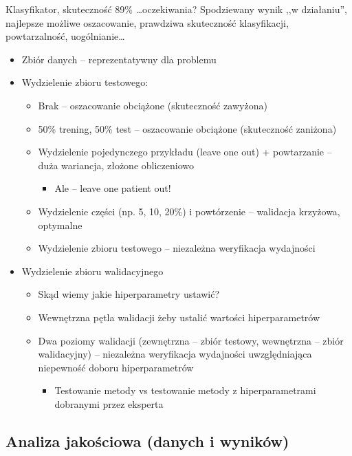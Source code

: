 \documentclass[11pt, xcolor={dvipsnames,svgnames},aspectratio=169]{beamer}
\theoremstyle{plain}
\theoremstyle{plain}
\begin{document}
\begin{frame}
	Klasyfikator, skuteczność 89\% \dots oczekiwania? \pause Spodziewany wynik ,,w działaniu'', najlepsze możliwe oszacowanie, prawdziwa skuteczność klasyfikacji, powtarzalność, uogólnianie\dots
	\begin{itemize}
		\item Zbiór danych -- reprezentatywny dla problemu\pause
		\item Wydzielenie zbioru testowego:
			\begin{itemize}
				\item Brak -- oszacowanie obciążone (skuteczność zawyżona)
				\item 50\% trening, 50\% test -- oszacowanie obciążone (skuteczność zaniżona)
				\item Wydzielenie pojedynczego przykładu (leave one out) + powtarzanie -- duża wariancja, złożone obliczeniowo
					\begin{itemize}
						\item Ale -- leave one patient out!
					\end{itemize}
				\item Wydzielenie części (np. 5, 10, 20\%) i powtórzenie -- walidacja krzyżowa, optymalne\pause
				\item Wydzielenie zbioru testowego -- niezależna weryfikacja wydajności
			\end{itemize}\pause
		\item Wydzielenie zbioru walidacyjnego\pause
			\begin{itemize}
				\item Skąd wiemy jakie hiperparametry ustawić?\pause
				\item Wewnętrzna pętla walidacji żeby ustalić wartości hiperparametrów
				\item Dwa poziomy walidacji (zewnętrzna -- zbiór testowy, wewnętrzna -- zbiór walidacyjny) -- niezależna weryfikacja wydajności uwzględniająca niepewność doboru hiperparametrów
					\begin{itemize}
						\item Testowanie metody vs testowanie metody z hiperparametrami dobranymi przez eksperta
					\end{itemize}
			\end{itemize}
	\end{itemize}
	
	
\end{frame}

\subsection{Analiza jakościowa (danych i wyników)}
\end{document}
